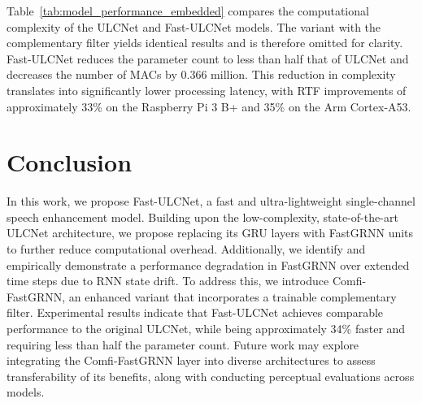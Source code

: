 \documentclass[9pt]{article}
\begin{document}
Table~\ref{tab:model_performance_embedded} compares the computational complexity of the ULCNet and Fast-ULCNet models. The variant with the complementary filter yields identical results and is therefore omitted for clarity. Fast-ULCNet reduces the parameter count to less than half that of ULCNet and decreases the number of MACs by 0.366 million. This reduction in complexity translates into significantly lower processing latency, with RTF improvements of approximately 33\% on the Raspberry Pi 3 B+ and 35\% on the Arm Cortex-A53.

\section{Conclusion}
\label{sec:conclusion}
In this work, we propose Fast-ULCNet, a fast and ultra-lightweight single-channel speech enhancement model. Building upon the low-complexity, state-of-the-art ULCNet architecture, we propose replacing its GRU layers with FastGRNN units to further reduce computational overhead. Additionally, we identify and empirically demonstrate a performance degradation in FastGRNN over extended time steps due to RNN state drift. To address this, we introduce Comfi-FastGRNN, an enhanced variant that incorporates a trainable complementary filter. Experimental results indicate that Fast-ULCNet achieves comparable performance to the original ULCNet, while being approximately 34\% faster and requiring less than half the parameter count. Future work may explore integrating the Comfi-FastGRNN layer into diverse architectures to assess transferability of its benefits, along with conducting perceptual evaluations across models.
\vfill
\pagebreak






\end{document}
